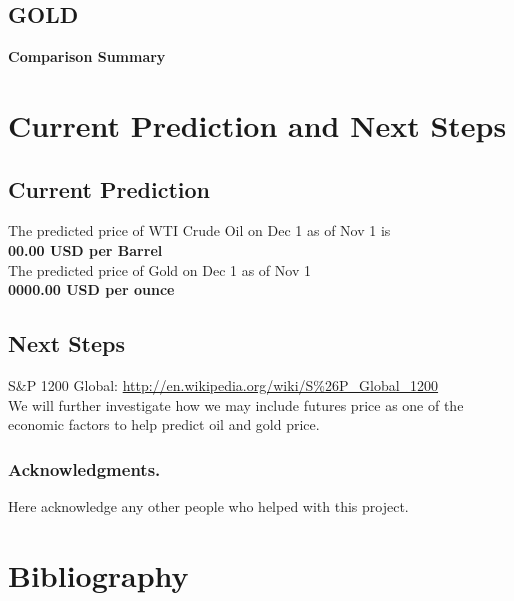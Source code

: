 \documentclass[runningheads]{llncs}
\begin{document}
\newpage
\subsection {GOLD}

\noindent\textbf{Comparison Summary} \\


\newpage

\section{Current Prediction and Next Steps}

\subsection {Current Prediction}
\noindent The predicted price of WTI Crude Oil on Dec 1 as of Nov 1 is \\
\textbf{00.00 USD per Barrel} \\

\noindent The predicted price of Gold on Dec 1 as of Nov 1 \\
\textbf{0000.00 USD per ounce} \\

\subsection {Next Steps}

S\&P 1200 Global: \url {http://en.wikipedia.org/wiki/S%26P_Global_1200} \\

\noindent We will further investigate how we may include futures price as one of the economic factors to help predict oil and gold price. \\


\subsubsection*{Acknowledgments.} Here acknowledge any other people who helped with this project.

\section{Bibliography}\label{references}
\end{document}
